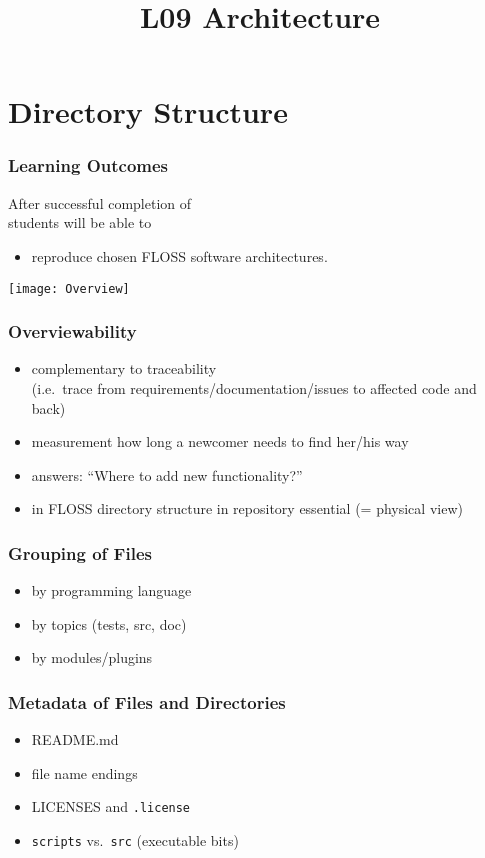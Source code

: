 

\title{L09 Architecture}




\section{Directory Structure}

\begin{frame}
	\frametitle{Learning Outcomes}
	After successful completion of \inserttitle \\
	students will be able to

	\begin{itemize}
	\item reproduce chosen FLOSS software architectures.
	\end{itemize}
\end{frame}

\begin{frame}
	\texttt{[image: Overview]}
\end{frame}

\begin{frame}
	\frametitle{Overviewability}

	\begin{itemize}[<+-| alert@+>]
	\item complementary to traceability \\ (i.e.\ trace from requirements/documentation/issues to affected code and back)
	\item measurement how long a newcomer needs to find her/his way
	\item answers: ``Where to add new functionality?''
	\item in FLOSS directory structure in repository essential (= physical view)
	\end{itemize}
\end{frame}

\begin{frame}
	\frametitle{Grouping of Files}

	\begin{itemize}[<+-| alert@+>]
	\item by programming language
	\item by topics (tests, src, doc)
	\item by modules/plugins
	\end{itemize}
\end{frame}

\begin{frame}
	\frametitle{Metadata of Files and Directories}

	\begin{itemize}[<+-| alert@+>]
	\item README.md
	\item file name endings
	\item LICENSES and \texttt{.license}
	\item \texttt{scripts} vs.\ \texttt{src} (executable bits)
	\end{itemize}
\end{frame}


